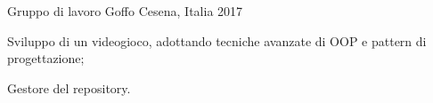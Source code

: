 \begin{cventries}
{        
        {Gruppo di lavoro Goffo}
        {Cesena, Italia}
        {2017}
        {
            \begin{cvitems}
                \item {Sviluppo di un videogioco, adottando tecniche avanzate di OOP e pattern di progettazione;}
                \item {Gestore del repository.}
            \end{cvitems}
        }
    }
\end{cventries}